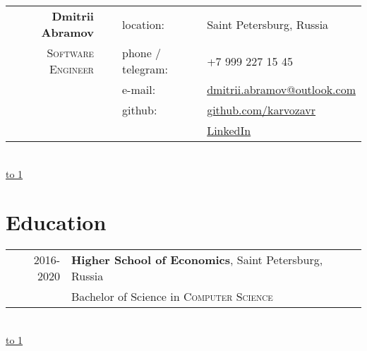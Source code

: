 \documentclass[10pt]{article}
\def\LINE{\vspace*{-1em}\noindent \underline{\hbox to 1\textwidth{{ } \hfil{ } \hfil{ } }}}
\begin{document}

\begin{tabular}{rlll}
       {\bf \huge Dmitrii Abramov} &  \  & location: &Saint Petersburg, Russia\\ 
    \textsc{\color{accent} Software Engineer} & \ & phone / telegram:   & +7 999 227 15 45\\
    & \ & e-mail:             & \href{mailto:dmitrii.abramov@outlook.com}{dmitrii.abramov@outlook.com}\\
    & \ & github:             & \href{https://github.com/karvozavr}{github.com/karvozavr}\\
   & \ &   \                 & \href{https://www.linkedin.com/in/dmitriy-abramov/}{LinkedIn}  
\end{tabular}
 \\
\LINE

\section*{\color{accent} Education}
\begin{tabular}{rl}
 \textsc{2016-2020} & \textbf{Higher School of Economics}, Saint Petersburg, Russia\\
 \  & Bachelor of Science in \textsc{Computer Science}
\end{tabular}



\  \\

\LINE
\end{document}
